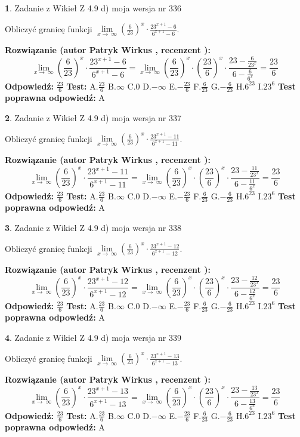 \documentclass[12pt, a4paper]{article}
\theoremstyle{definition} %
\newtheorem{zad}{}
\newcommand{\zadStart}[1]{\begin{zad}#1\newline}
\newcommand{\zadStop}{\end{zad}}
\newcommand{\rozwStart}[2]{\noindent \textbf{Rozwiązanie (autor #1 , recenzent #2): }\newline}
\newcommand{\rozwStop}{\newline}
\newcommand{\odpStart}{\noindent \textbf{Odpowiedź:}\newline}
\newcommand{\odpStop}{\newline}
\newcommand{\testStart}{\noindent \textbf{Test:}\newline}
\newcommand{\testStop}{\newline}
\newcommand{\kluczStart}{\noindent \textbf{Test poprawna odpowiedź:}\newline}
\newcommand{\kluczStop}{\newline}
\begin{document}
\zadStart{Zadanie z Wikieł Z 4.9 d) moja wersja nr 336}


Obliczyć granicę funkcji  $\lim\limits_{x\to\ \infty}(\frac{6}{23})^{x}\cdot\frac{23^{x+1}-6}{6^{x+1}-6}$.
\zadStop
\rozwStart{Patryk Wirkus}{}
$$\lim\limits_{x\to\ \infty}(\frac{6}{23})^{x}\cdot\frac{23^{x+1}-6}{6^{x+1}-6}=\lim\limits_{x\to\ \infty}(\frac{6}{23})^{x}\cdot(\frac{23}{6})^{x} \cdot \frac{23-\frac{6}{23^{x}}}{6-\frac{6}{6^{x}}} = \frac{23}{6}$$
\rozwStop
\odpStart
$\frac{23}{6}$
\odpStop
\testStart
A.$\frac{23}{6}$ B.$\infty$ C.$0$ D.$-\infty$ E.$-\frac{23}{6}$
F.$\frac{6}{23}$ G.$-\frac{6}{23}$
H.$6^{23}$
I.$23^{6}$
\testStop
\kluczStart
A
\kluczStop



\zadStart{Zadanie z Wikieł Z 4.9 d) moja wersja nr 337}


Obliczyć granicę funkcji  $\lim\limits_{x\to\ \infty}(\frac{6}{23})^{x}\cdot\frac{23^{x+1}-11}{6^{x+1}-11}$.
\zadStop
\rozwStart{Patryk Wirkus}{}
$$\lim\limits_{x\to\ \infty}(\frac{6}{23})^{x}\cdot\frac{23^{x+1}-11}{6^{x+1}-11}=\lim\limits_{x\to\ \infty}(\frac{6}{23})^{x}\cdot(\frac{23}{6})^{x} \cdot \frac{23-\frac{11}{23^{x}}}{6-\frac{11}{6^{x}}} = \frac{23}{6}$$
\rozwStop
\odpStart
$\frac{23}{6}$
\odpStop
\testStart
A.$\frac{23}{6}$ B.$\infty$ C.$0$ D.$-\infty$ E.$-\frac{23}{6}$
F.$\frac{6}{23}$ G.$-\frac{6}{23}$
H.$6^{23}$
I.$23^{6}$
\testStop
\kluczStart
A
\kluczStop



\zadStart{Zadanie z Wikieł Z 4.9 d) moja wersja nr 338}


Obliczyć granicę funkcji  $\lim\limits_{x\to\ \infty}(\frac{6}{23})^{x}\cdot\frac{23^{x+1}-12}{6^{x+1}-12}$.
\zadStop
\rozwStart{Patryk Wirkus}{}
$$\lim\limits_{x\to\ \infty}(\frac{6}{23})^{x}\cdot\frac{23^{x+1}-12}{6^{x+1}-12}=\lim\limits_{x\to\ \infty}(\frac{6}{23})^{x}\cdot(\frac{23}{6})^{x} \cdot \frac{23-\frac{12}{23^{x}}}{6-\frac{12}{6^{x}}} = \frac{23}{6}$$
\rozwStop
\odpStart
$\frac{23}{6}$
\odpStop
\testStart
A.$\frac{23}{6}$ B.$\infty$ C.$0$ D.$-\infty$ E.$-\frac{23}{6}$
F.$\frac{6}{23}$ G.$-\frac{6}{23}$
H.$6^{23}$
I.$23^{6}$
\testStop
\kluczStart
A
\kluczStop



\zadStart{Zadanie z Wikieł Z 4.9 d) moja wersja nr 339}


Obliczyć granicę funkcji  $\lim\limits_{x\to\ \infty}(\frac{6}{23})^{x}\cdot\frac{23^{x+1}-13}{6^{x+1}-13}$.
\zadStop
\rozwStart{Patryk Wirkus}{}
$$\lim\limits_{x\to\ \infty}(\frac{6}{23})^{x}\cdot\frac{23^{x+1}-13}{6^{x+1}-13}=\lim\limits_{x\to\ \infty}(\frac{6}{23})^{x}\cdot(\frac{23}{6})^{x} \cdot \frac{23-\frac{13}{23^{x}}}{6-\frac{13}{6^{x}}} = \frac{23}{6}$$
\rozwStop
\odpStart
$\frac{23}{6}$
\odpStop
\testStart
A.$\frac{23}{6}$ B.$\infty$ C.$0$ D.$-\infty$ E.$-\frac{23}{6}$
F.$\frac{6}{23}$ G.$-\frac{6}{23}$
H.$6^{23}$
I.$23^{6}$
\testStop
\kluczStart
A
\kluczStop
\end{document}
